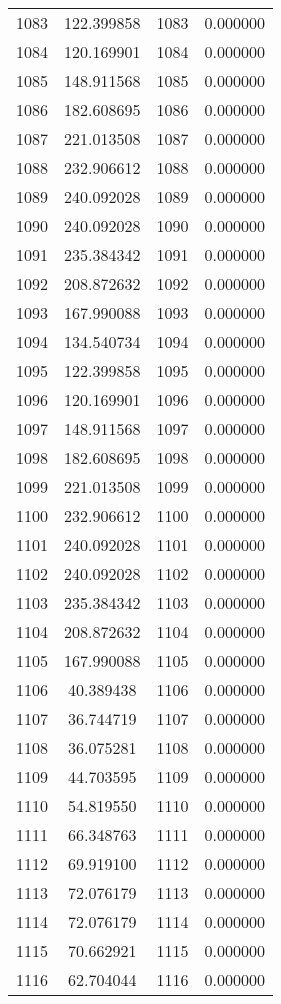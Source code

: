 \documentclass[12pt]{article}
\begin{document}
\begin{longtable}{@{}cccc@{}}
1083 & 122.399858 & 1083 & 0.000000 \\
1084 & 120.169901 & 1084 & 0.000000 \\
1085 & 148.911568 & 1085 & 0.000000 \\
1086 & 182.608695 & 1086 & 0.000000 \\
1087 & 221.013508 & 1087 & 0.000000 \\
1088 & 232.906612 & 1088 & 0.000000 \\
1089 & 240.092028 & 1089 & 0.000000 \\
1090 & 240.092028 & 1090 & 0.000000 \\
1091 & 235.384342 & 1091 & 0.000000 \\
1092 & 208.872632 & 1092 & 0.000000 \\
1093 & 167.990088 & 1093 & 0.000000 \\
1094 & 134.540734 & 1094 & 0.000000 \\
1095 & 122.399858 & 1095 & 0.000000 \\
1096 & 120.169901 & 1096 & 0.000000 \\
1097 & 148.911568 & 1097 & 0.000000 \\
1098 & 182.608695 & 1098 & 0.000000 \\
1099 & 221.013508 & 1099 & 0.000000 \\
1100 & 232.906612 & 1100 & 0.000000 \\
1101 & 240.092028 & 1101 & 0.000000 \\
1102 & 240.092028 & 1102 & 0.000000 \\
1103 & 235.384342 & 1103 & 0.000000 \\
1104 & 208.872632 & 1104 & 0.000000 \\
1105 & 167.990088 & 1105 & 0.000000 \\
1106 & 40.389438 & 1106 & 0.000000 \\
1107 & 36.744719 & 1107 & 0.000000 \\
1108 & 36.075281 & 1108 & 0.000000 \\
1109 & 44.703595 & 1109 & 0.000000 \\
1110 & 54.819550 & 1110 & 0.000000 \\
1111 & 66.348763 & 1111 & 0.000000 \\
1112 & 69.919100 & 1112 & 0.000000 \\
1113 & 72.076179 & 1113 & 0.000000 \\
1114 & 72.076179 & 1114 & 0.000000 \\
1115 & 70.662921 & 1115 & 0.000000 \\
1116 & 62.704044 & 1116 & 0.000000 \\

\end{longtable}
\end{document}
